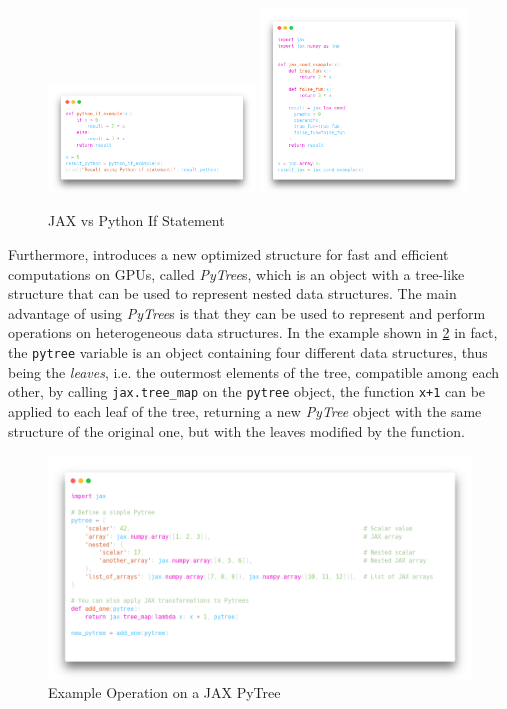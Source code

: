 \begin{figure}[h]
    \centering
    \caption{JAX vs Python If Statement}
    \label{fig:jax_python_if}
    \includegraphics[width=0.49\textwidth]{Images/python_if.png}
    \includegraphics[width=0.49\textwidth]{Images/jax_if.png}
\end{figure}

Furthermore, \jax introduces a new optimized structure for fast and efficient computations on \ac{GPU}s, called \textit{PyTree}s, which is an object with a tree-like structure that can be used to represent nested data structures. The main advantage of using \textit{PyTree}s is that they can be used to represent and perform operations on heterogeneous data structures. In the example shown in \cref{fig:pytree_example} in fact, the \texttt{pytree} variable is an object containing four different data structures, thus being the \textit{leaves}, i.e. the outermost elements of the tree, compatible among each other, by calling \texttt{jax.tree\_map} on the \texttt{pytree} object, the function \texttt{x+1} can be applied to each leaf of the tree, returning a new \textit{PyTree} object with the same structure of the original one, but with the leaves modified by the function.

\begin{figure}[h]
    \centering
    \caption{Example Operation on a JAX PyTree}
    \label{fig:pytree_example}
    \includegraphics[width=\textwidth]{Images/pytree_example.png}
\end{figure}


